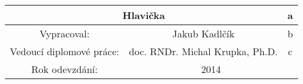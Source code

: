 \documentclass[10pt,a4paper]{article}
\begin{document}
	\begin{tabular}{|c|c|c|}
		\hline
		\multicolumn{2}{|c|}{Hlavička} & a\\ \hline
		Vypracoval:& Jakub Kadlčík & b\\ \hline
		Vedoucí diplomové práce:& doc. RNDr. Michal Krupka, Ph.D. & c\\ \hline
		Rok odevzdání:& \multicolumn{2}{c|}{2014}\\ \hline
	\end{tabular}
\end{document}
